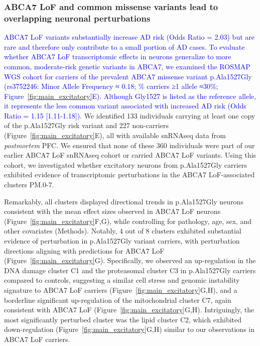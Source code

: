 \subsubsection{ABCA7 LoF and common missense variants lead to overlapping neuronal perturbations}
\newcommand{\quoteL}{\textcolor{blue}{ABCA7 LoF variants substantially increase AD risk (Odds Ratio = 2.03)\cite{Steinberg2015-mu} but are rare and therefore only contribute to a small portion of AD cases\cite{Duchateau2024-rf}. To evaluate whether ABCA7 LoF transcriptomic effects in neurons generalize to more common, moderate-risk genetic variants in ABCA7, we examined the ROSMAP WGS cohort for carriers of the prevalent ABCA7 missense variant p.Ala1527Gly (rs3752246: Minor Allele Frequency ≈ 0.18; \% carriers ≥1 allele ≈30\%; Figure~\ref{fig:main_excitatory}E). Although Gly1527 is listed as the reference allele, it represents the less common variant associated with increased AD risk (Odds Ratio = 1.15 [1.11-1.18])\cite{Kunkle2019-yo,Holstege2022-vp,Naj2011-bs}. \label{quoteL-label}}} 
\quoteL We identified 133 individuals carrying at least one copy of the p.Ala1527Gly risk variant and 227 non-carriers (Figure~\ref{fig:main_excitatory}E), all with available snRNAseq data from \textit{postmortem} PFC\cite{Mathys2023-rs}. We ensured that none of these 360 individuals were part of our earlier ABCA7 LoF snRNAseq cohort or carried ABCA7 LoF variants. Using this cohort, we investigated whether excitatory neurons from p.Ala1527Gly carriers exhibited evidence of transcriptomic perturbations in the ABCA7 LoF-associated clusters PM.0-7.

Remarkably, all clusters displayed directional trends in p.Ala1527Gly neurons consistent with the mean effect sizes observed in ABCA7 LoF neurons (Figure~\ref{fig:main_excitatory}F,G), while controlling for pathology, age, sex, and other covariates (Methods). Notably, 4 out of 8 clusters exhibited substantial evidence of perturbation in p.Ala1527Gly variant carriers, with perturbation directions aligning with predictions for ABCA7 LoF (Figure~\ref{fig:main_excitatory}G). Specifically, we observed an up-regulation in the DNA damage cluster C1 and the proteasomal cluster C3 in p.Ala1527Gly carriers compared to controls, suggesting a similar cell stress and genomic instability signature to ABCA7 LoF carriers (Figure~\ref{fig:main_excitatory}G,H), and a borderline significant up-regulation of the mitochondrial cluster C7, again consistent with ABCA7 LoF (Figure~\ref{fig:main_excitatory}G,H). Intriguingly, the most significantly perturbed cluster was the lipid cluster C2, which exhibited down-regulation (Figure~\ref{fig:main_excitatory}G,H) similar to our observations in ABCA7 LoF carriers. 

